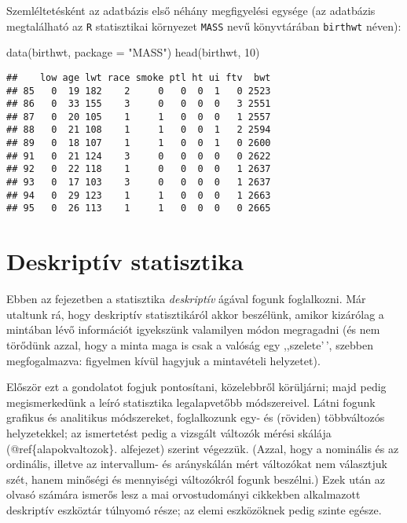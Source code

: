 \documentclass[
]{book}
\newenvironment{Shaded}{\begin{snugshade}}{\end{snugshade}}
\newcommand{\AttributeTok}[1]{\textcolor[rgb]{0.77,0.63,0.00}{#1}}
\newcommand{\DecValTok}[1]{\textcolor[rgb]{0.00,0.00,0.81}{#1}}
\newcommand{\FunctionTok}[1]{\textcolor[rgb]{0.00,0.00,0.00}{#1}}
\newcommand{\NormalTok}[1]{#1}
\newcommand{\StringTok}[1]{\textcolor[rgb]{0.31,0.60,0.02}{#1}}
\begin{document}
Szemléltetésként az adatbázis első néhány megfigyelési egysége (az adatbázis megtalálható az \texttt{R} statisztikai környezet \texttt{MASS} nevű könyvtárában \texttt{birthwt} néven):

\begin{Shaded}
\begin{Highlighting}[]
\FunctionTok{data}\NormalTok{(birthwt, }\AttributeTok{package =} \StringTok{"MASS"}\NormalTok{)}
\FunctionTok{head}\NormalTok{(birthwt, }\DecValTok{10}\NormalTok{)}
\end{Highlighting}
\end{Shaded}

\begin{verbatim}
##    low age lwt race smoke ptl ht ui ftv  bwt
## 85   0  19 182    2     0   0  0  1   0 2523
## 86   0  33 155    3     0   0  0  0   3 2551
## 87   0  20 105    1     1   0  0  0   1 2557
## 88   0  21 108    1     1   0  0  1   2 2594
## 89   0  18 107    1     1   0  0  1   0 2600
## 91   0  21 124    3     0   0  0  0   0 2622
## 92   0  22 118    1     0   0  0  0   1 2637
## 93   0  17 103    3     0   0  0  0   1 2637
## 94   0  29 123    1     1   0  0  0   1 2663
## 95   0  26 113    1     1   0  0  0   0 2665
\end{verbatim}

\hypertarget{deskriptiv}{%
\chapter{Deskriptív statisztika}\label{deskriptiv}}

Ebben az fejezetben a statisztika \emph{deskriptív} ágával fogunk foglalkozni. Már utaltunk rá, hogy deskriptív statisztikáról akkor beszélünk, amikor kizárólag a mintában lévő információt igyekszünk valamilyen módon megragadni (és nem törődünk azzal, hogy a minta maga is csak a valóság egy ,,szelete'\,', szebben megfogalmazva: figyelmen kívül hagyjuk a mintavételi helyzetet).

Először ezt a gondolatot fogjuk pontosítani, közelebbről körüljárni; majd pedig megismerkedünk a leíró statisztika legalapvetőbb módszereivel. Látni fogunk grafikus és analitikus módszereket, foglalkozunk egy- és (röviden) többváltozós helyzetekkel; az ismertetést pedig a vizsgált változók mérési skálája (@ref\{alapokvaltozok\}. alfejezet) szerint végezzük. (Azzal, hogy a nominális és az ordinális, illetve az intervallum- és arányskálán mért változókat nem választjuk szét, hanem minőségi és mennyiségi változókról fogunk beszélni.) Ezek után az olvasó számára ismerős lesz a mai orvostudományi cikkekben alkalmazott deskriptív eszköztár túlnyomó része; az elemi eszközöknek pedig szinte egésze.
\end{document}
